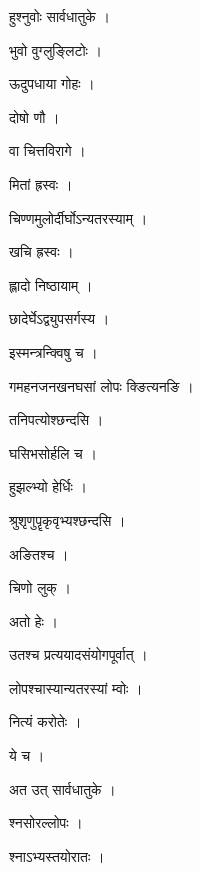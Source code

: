 \documentclass[10pt, openany, oneside]{book}
\begin{document}
\noindent हुश्नुवोः सार्वधातुके ।

\noindent भुवो वुग्लुङ्लिटोः ।

\noindent ऊदुपधाया गोहः ।

\noindent दोषो णौ ।

\noindent वा चित्तविरागे ।

\noindent मितां ह्रस्वः ।

\noindent चिण्णमुलोर्दीर्घोऽन्यतरस्याम् ।

\noindent खचि ह्रस्वः ।

\noindent ह्लादो निष्ठायाम् ।

\noindent छादेर्घेऽद्व्युपसर्गस्य ।

\noindent इस्मन्त्रन्क्विषु च ।

\noindent गमहनजनखनघसां लोपः क्ङित्यनङि ।

\noindent तनिपत्योश्छन्दसि ।

\noindent घसिभसोर्हलि च ।

\noindent हुझल्भ्यो हेर्धिः ।

\noindent श्रुश‍ृणुपॄकृवृभ्यश्छन्दसि ।

\noindent अङितश्च ।

\noindent चिणो लुक् ।

\noindent अतो हेः ।

\noindent उतश्च प्रत्ययादसंयोगपूर्वात् ।

\noindent लोपश्चास्यान्यतरस्यां म्वोः ।

\noindent नित्यं करोतेः ।

\noindent ये च ।

\noindent अत उत् सार्वधातुके ।

\noindent श्नसोरल्लोपः ।

\noindent श्नाऽभ्यस्तयोरातः ।
\end{document}
